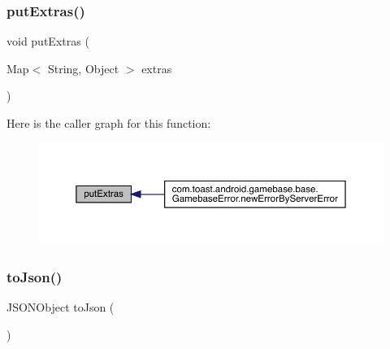 \subsubsection{\texorpdfstring{put\+Extras()}{putExtras()}}
{\footnotesize\ttfamily void put\+Extras (\begin{DoxyParamCaption}\item[{Map$<$ String, Object $>$}]{extras }\end{DoxyParamCaption})}

Here is the caller graph for this function\+:
\nopagebreak
\begin{figure}[H]
\begin{center}
\leavevmode
\includegraphics[width=350pt]{classcom_1_1toast_1_1android_1_1gamebase_1_1base_1_1_gamebase_exception_a4c2f908275e5fc56081aabb2f71a50e7_icgraph}
\end{center}
\end{figure}
\mbox{\label{classcom_1_1toast_1_1android_1_1gamebase_1_1base_1_1_gamebase_exception_a6b2a39146828e6b135949df810b8e052}} 
\subsubsection{\texorpdfstring{to\+Json()}{toJson()}}
{\footnotesize\ttfamily J\+S\+O\+N\+Object to\+Json (\begin{DoxyParamCaption}{ }\end{DoxyParamCaption})}

